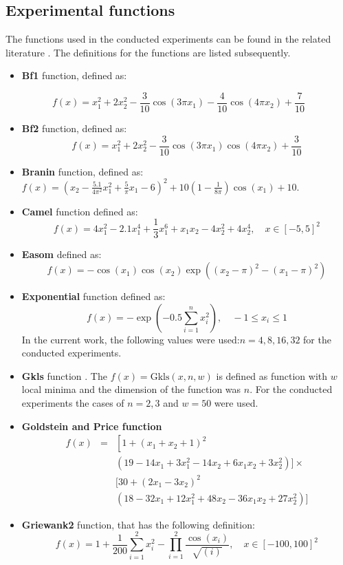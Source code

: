 \documentclass[journal,article,submit,pdftex,moreauthors]{Definitions/mdpi}
\begin{document}
\subsection{Experimental functions}
The functions used in the conducted experiments can be found in the related literature \cite{ali2005numerical,floudas2013handbook}. The definitions for the
functions are listed subsequently.
\begin{itemize}

\item \textbf{Bf1} function, defined as:
\end{itemize}
\[
f(x)=x_{1}^{2}+2x_{2}^{2}-\frac{3}{10}\cos\left(3\pi x_{1}\right)-\frac{4}{10}\cos\left(4\pi x_{2}\right)+\frac{7}{10}
\]
\begin{itemize}
\item \textbf{Bf2} function, defined as:
\[
f(x)=x_{1}^{2}+2x_{2}^{2}-\frac{3}{10}\cos\left(3\pi x_{1}\right)\cos\left(4\pi x_{2}\right)+\frac{3}{10}
\]
\item \textbf{Branin} function, defined as: $f(x)=\left(x_{2}-\frac{5.1}{4\pi^{2}}x_{1}^{2}+\frac{5}{\pi}x_{1}-6\right)^{2}+10\left(1-\frac{1}{8\pi}\right)\cos(x_{1})+10$.
\item \textbf{Camel} function defined as:
\[
f(x)=4x_{1}^{2}-2.1x_{1}^{4}+\frac{1}{3}x_{1}^{6}+x_{1}x_{2}-4x_{2}^{2}+4x_{2}^{4},\quad x\in[-5,5]^{2}
\]

\item \textbf{Easom} defined as:
\[
f(x)=-\cos\left(x_{1}\right)\cos\left(x_{2}\right)\exp\left(\left(x_{2}-\pi\right)^{2}-\left(x_{1}-\pi\right)^{2}\right)
\]

\item \textbf{Exponential} function defined as:
\[
f(x)=-\exp\left(-0.5\sum_{i=1}^{n}x_{i}^{2}\right),\quad-1\le x_{i}\le1
\]
In the current work, the following values were used:$n=4,8,16,32$ for the conducted experiments.
\item \textbf{Gkls} function  \citep{Gaviano}. The $f(x)=\mbox{Gkls}(x,n,w)$ is defined as function with $w$ local minima and the dimension of the function was $n$. For the conducted experiments the cases of  $n=2,3$ and $w=50$ were used.
\item \textbf{Goldstein and Price function }\\
\begin{eqnarray*}
f(x) & = & \left[1+\left(x_{1}+x_{2}+1\right)^{2}\right.\\
 &  & \left(19-14x_{1}+3x_{1}^{2}-14x_{2}+6x_{1}x_{2}+3x_{2}^{2}\right)]\times\\
 &  & [30+\left(2x_{1}-3x_{2}\right)^{2}\\
 &  & \left(18-32x_{1}+12x_{1}^{2}+48x_{2}-36x_{1}x_{2}+27x_{2}^{2}\right)]
\end{eqnarray*}
\item \textbf{Griewank2} function, that has the following definition:
\[
f(x)=1+\frac{1}{200}\sum_{i=1}^{2}x_{i}^{2}-\prod_{i=1}^{2}\frac{\cos(x_{i})}{\sqrt{(i)}},\quad x\in[-100,100]^{2}
\]


\end{itemize}
\end{document}

